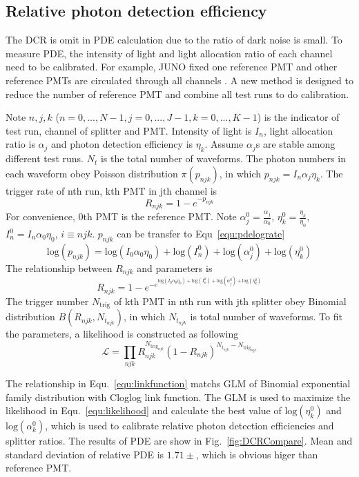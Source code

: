 \subsection{Relative photon detection efficiency}
The DCR is omit in PDE calculation due to the ratio of dark noise is small. To measure PDE, the intensity of light and light allocation ratio of each channel need to be calibrated. For example, JUNO fixed one reference PMT and other reference PMTs are circulated through all channels \cite{Wonsak_2021}. A new method is designed to reduce the number of reference PMT and combine all test runs to do calibration.

Note $n,j,k$ ($n=0,...,N-1, j=0,...,J-1, k=0,...,K-1$) is the indicator of test run, channel of splitter and PMT. Intensity of light is $I_n$, light allocation ratio is $\alpha_j$ and photon detection efficiency is $\eta_k$. Assume $\alpha_j$s are stable among different test runs. $N_t$ is the total number of waveforms. The photon numbers in each waveform obey Poisson distribution $\pi(p_{njk})$, in which $p_{njk}=I_n\alpha_j\eta_k$. The trigger rate of nth run, kth PMT in jth channel is
\begin{equation}
    \label{equ:pderate}
    R_{njk}=1-e^{-p_{njk}}
\end{equation}
For convenience, 0th PMT is the reference PMT. Note $\alpha_j^0=\frac{\alpha_j}{\alpha_0}$, $\eta_k^0=\frac{\eta_k}{\eta_0}$, $I_n^0=I_n\alpha_0\eta_0$, $i\equiv njk$. $p_{njk}$ can be transfer to Equ~\eqref{equ:pdelograte}
\begin{equation}
    \label{equ:pdelograte}
    \mathrm{log}(p_{njk})=\mathrm{log}(I_0\alpha_0\eta_0)+\mathrm{log}(I_n^0)+\mathrm{log}(\alpha_j^0)+\mathrm{log}(\eta_k^0)
\end{equation}
The relationship between $R_{njk}$ and parameters is
\begin{equation}
    \label{equ:linkfunction}
    R_{njk}=1-e^{-e^{\mathrm{log}(I_0\alpha_0\eta_0)+\mathrm{log}(I_n^0)+\mathrm{log}(\alpha_j^0)+\mathrm{log}(\eta_k^0)}}
\end{equation}
The trigger number $N_{\mathrm{trig}}$ of kth PMT in nth run with jth splitter obey Binomial distribution $B(R_{njk},N_{t_{njk}})$, in which $N_{t_{njk}}$ is total number of waveforms. To fit the parameters, a likelihood is constructed as following
\begin{equation}
    \label{equ:likelihood}
    \mathcal{L}=\prod_{njk}{R_{njk}^{N_{\mathrm{trig}_{njk}}}(1-R_{njk})^{N_{t_{njk}}-N_{\mathrm{trig}_{njk}}}}
\end{equation}

The relationship in Equ.~\eqref{equ:linkfunction} matchs GLM of Binomial exponential family distribution with Cloglog link function\cite{glm}. The GLM is used to maximize the likelihood in Equ.~\eqref{equ:likelihood} and calculate the best value of $\mathrm{log}(\eta_k^0)$ and $\mathrm{log}(\alpha_k^0)$, which is used to calibrate relative photon detection efficiencies and splitter ratios. The results of PDE are show in Fig.~\ref{fig:DCRCompare}. Mean and standard deviation of relative PDE is $1.71\pm$, which is obvious higer than reference PMT.